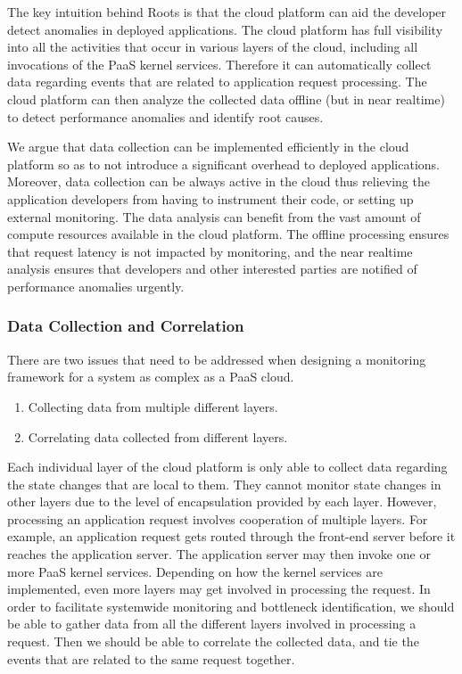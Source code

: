 The key intuition behind Roots is that
the cloud platform can aid the developer detect anomalies in deployed applications.
The cloud platform has full visibility into all the activities that occur in various layers of the cloud,
including all invocations of the PaaS kernel services. Therefore
it can automatically collect data regarding events that are related to application request processing. 
The cloud platform can then analyze the collected data offline (but in near realtime) to detect 
performance anomalies and identify root causes.

We argue that data collection can be implemented efficiently in the cloud platform so as to not
introduce a significant overhead to deployed applications.
Moreover, data collection can be always active in the cloud thus relieving the application developers
from having to instrument their code, or setting up external monitoring.
The data analysis can benefit from the vast amount of compute
resources available in the cloud platform. The offline processing ensures that request
latency is not impacted by monitoring, and the near realtime analysis ensures that developers
and other interested parties are notified of performance anomalies urgently. 

\subsubsection{Data Collection and Correlation}

There are two issues that need to be addressed when designing a monitoring framework for
a system as complex as a PaaS cloud.
\begin{enumerate}
\item Collecting data from multiple different layers.
\item Correlating data collected from different layers.
\end{enumerate}

Each individual layer of the cloud platform is only able to collect data regarding the
state changes that are local to them. They cannot monitor state changes
in other layers due to the level of encapsulation provided by each layer. However,
processing an application request involves cooperation of multiple 
layers. For example, an application request gets routed through the front-end server before
it reaches the application server. The application server may then invoke one or more PaaS kernel
services. Depending on how the kernel services are implemented,
even more layers may get involved in processing the request. 
In order to facilitate systemwide monitoring and
bottleneck identification, we should be able to gather data from all the different layers involved
in processing a request. Then we should be able to correlate the collected data, and tie the events that
are related to the same request together.


